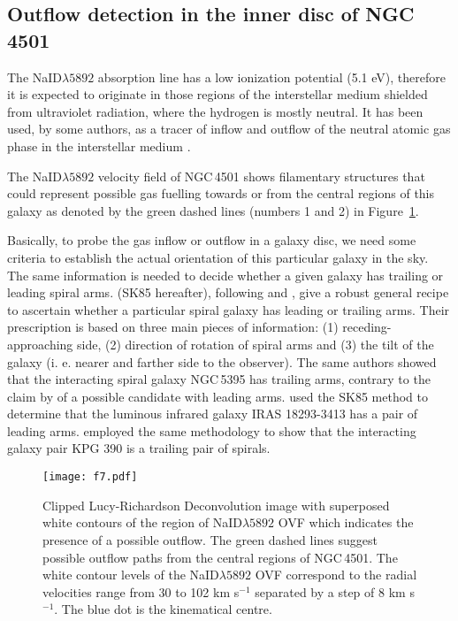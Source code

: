 \documentclass[fleqn,usenatbib]{mnras}
\begin{document}
\subsection{Outflow detection in the inner disc of NGC\,4501}\label{sec:s6}

The NaID$\lambda5892$ absorption line has a low ionization potential (5.1 eV), therefore it is expected to originate in those regions of the interstellar medium shielded from 
ultraviolet radiation, where the hydrogen is mostly neutral. It has been used, by some authors, as a tracer of inflow and outflow of the neutral atomic gas phase in the interstellar 
medium \citep{Phillips1993, Heckman2000, Rupke2005, Davis2012, Rupke2015}.

The NaID$\lambda5892$ velocity field of NGC\,4501 shows filamentary structures that could represent possible gas fuelling towards or from the central regions of this galaxy 
as denoted by the green dashed lines (numbers 1 and 2) in Figure~\ref{fig7}.

Basically, to probe the gas inflow or outflow in a galaxy disc, we need some criteria to establish the actual orientation of this particular galaxy in the sky. The same information
is needed to decide whether a given galaxy has trailing or leading spiral arms. \citet{Sharp1985} (SK85 hereafter), following \citet{deVaucouleurs1958} and \citet{Holmberg1947}, give a 
robust general recipe to ascertain whether a particular spiral galaxy has leading or trailing arms. Their prescription is based on three main pieces of information: (1) 
receding-approaching side, (2) direction of rotation of spiral arms and (3) the tilt of the galaxy (i. e. nearer and farther side to the observer). The same authors showed that the 
interacting spiral galaxy NGC\,5395 has trailing arms, contrary to the claim by \citet{Pasha1982} of a possible candidate with leading arms. \citet{Vaisanen2008} used the SK85 method 
to determine that the luminous infrared galaxy IRAS 18293-3413 has a pair of leading arms. \citet{Repetto2010} employed the same methodology to show that the interacting galaxy pair 
KPG 390 is a trailing pair of spirals.

\begin{figure}
\hspace*{-2.1cm}
\texttt{[image: f7.pdf]}
\caption{Clipped Lucy-Richardson Deconvolution image with superposed white contours of the region 
of NaID$\lambda5892$ OVF which indicates the presence of a possible outflow. The green dashed lines 
suggest possible outflow paths from the central regions of NGC\,4501. The white contour levels of 
the NaID$\lambda5892$ OVF correspond to the radial velocities range from 30 to 102 km s$^{-1}$ 
separated by a step of 8 km s$^{-1}$. The blue dot is the kinematical centre.}
\label{fig7} 
\end{figure}
\end{document}
